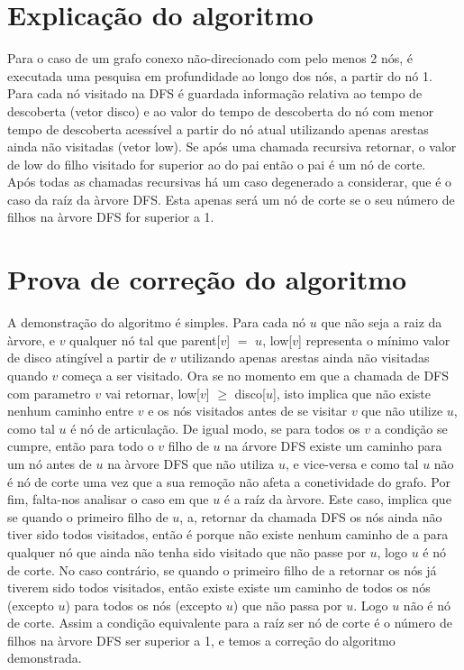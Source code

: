 \documentclass{scrartcl}
\begin{document}
\section*{Explicação do algoritmo}
 Para o caso de um grafo conexo não-direcionado com pelo menos 2 nós, é executada uma pesquisa em profundidade ao longo dos nós, a partir do nó 1. Para cada nó visitado na DFS é guardada informação relativa ao tempo de descoberta (vetor disco) e ao valor do tempo de descoberta do nó com menor tempo de descoberta acessível a partir do nó atual utilizando apenas arestas ainda não visitadas (vetor low). Se após uma chamada recursiva retornar, o valor de low do filho visitado for superior ao do pai então o pai é um nó de corte.\\
Após todas as chamadas recursivas há um caso degenerado a considerar, que é o caso da raíz da àrvore DFS. Esta apenas será um nó de corte se o seu número de filhos na àrvore DFS for superior a 1.

\section*{Prova de correção do algoritmo}
A demonstração do algoritmo é simples. Para cada nó $u$ que não seja a raiz da àrvore, e $v$ qualquer nó tal que parent[$v$] $=$ $u$, low[$v$] representa o mínimo valor de disco atingível a partir de $v$ utilizando apenas arestas ainda não visitadas quando $v$ começa a ser visitado. Ora se no momento em que a chamada de DFS com parametro $v$ vai retornar, low[$v$] $\ge$ disco[$u$], isto implica que não existe nenhum caminho entre $v$ e os nós visitados antes de se visitar $v$ que não utilize $u$, como tal $u$ é nó de articulação. De igual modo, se para todos os $v$ a condição se cumpre, então para todo o $v$ filho de $u$ na árvore DFS existe um caminho para um nó antes de $u$ na àrvore DFS que não utiliza $u$, e vice-versa e como tal $u$ não é nó de corte uma vez que a sua remoção não afeta a conetividade do grafo. Por fim, falta-nos analisar o caso em que $u$ é a raíz da àrvore. Este caso, implica que se quando o primeiro filho de $u$, a, retornar da chamada DFS os nós ainda não tiver sido todos visitados, então é porque não existe nenhum caminho de a para qualquer nó que ainda não tenha sido visitado que não passe por $u$, logo $u$ é nó de corte. No caso contrário, se quando o primeiro filho de a retornar os nós já tiverem sido todos visitados, então existe existe um caminho de todos os nós (excepto $u$) para todos os nós (excepto $u$) que não passa por $u$. Logo $u$ não é nó de corte. Assim a condição equivalente para a raíz ser nó de corte é o número de filhos na àrvore DFS ser superior a 1, e temos a correção do algoritmo demonstrada.
\end{document}
